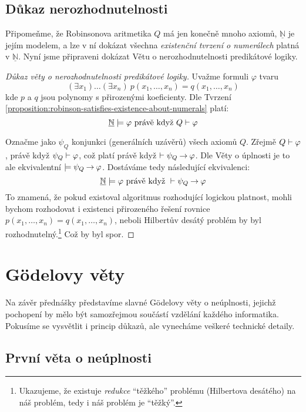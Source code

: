 \subsection{Důkaz nerozhodnutelnosti}

Připomeňme, že Robinsonova aritmetika $Q$ má jen konečně mnoho axiomů, $\underline{\mathbb N}$ je jejím modelem, a lze v ní dokázat všechna \emph{existenční tvrzení o numerálech} platná v $\underline{\mathbb N}$. Nyní jsme připraveni dokázat Větu o nerozhodnutelnosti predikátové logiky.

\begin{proof}[Důkaz věty o nerozhodnutelnosti predikátové logiky]
Uvažme formuli $\varphi$ tvaru 
$$(\exists x_1)\dots(\exists x_n)\ p(x_1,\dots,x_n)=q(x_1,\dots,x_n)
$$ 
kde $p$ a $q$ jsou polynomy s přirozenými koeficienty. Dle Tvrzení \ref{proposition:robinson-satisfies-existence-about-numerals} platí:
$$
\underline{\mathbb N}\models \varphi\text{ právě když }Q\vdash \varphi
$$

Označme jako $\psi_Q$ konjunkci (generálních uzávěrů) všech axiomů $Q$. Zřejmě $Q\vdash\varphi$, právě když $\psi_Q\vdash\varphi$, což platí právě když $\vdash\psi_Q\mathbin{\rightarrow}\varphi$. Dle Věty o úplnosti je to ale ekvivalentní $\models\psi_Q\mathbin{\rightarrow}\varphi$. Dostáváme tedy následující ekvivalenci:
$$
\underline{\mathbb N}\models \varphi\text{ právě když }\vdash \psi_Q\mathbin{\rightarrow}\varphi
$$
To znamená, že pokud existoval algoritmus rozhodující logickou platnost, mohli bychom rozhodovat i existenci přirozeného řešení rovnice $p(x_1,\dots,x_n)=q(x_1,\dots,x_n)$, neboli Hilbertův desátý problém by byl rozhodnutelný.\footnote{Ukazujeme, že existuje \emph{redukce} ``těžkého'' problému (Hilbertova desátého) na náš problém, tedy i náš problém je ``těžký''.} Což by byl spor.   
\end{proof}

\section{Gödelovy věty}

Na závěr přednášky představíme slavné Gödelovy věty o neúplnosti, jejichž pochopení by mělo být samozřejmou součástí vzdělání každého informatika. Pokusíme se vysvětlit i princip důkazů, ale vynecháme veškeré technické detaily.

\subsection{První věta o neúplnosti}

